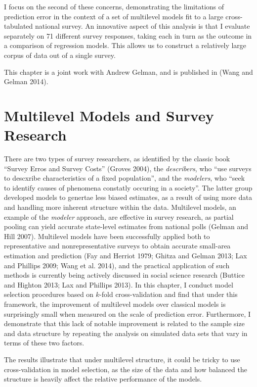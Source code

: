 I focus on the second of these concerns, demonstrating the limitations
of prediction error in the context of a set of multilevel models fit to
a large cross-tabulated national survey. An innovative aspect of this
analysis is that I evaluate separately on 71 different survey responses,
taking each in turn as the outcome in a comparison of regression models.
This allows us to construct a relatively large corpus of data out of a
single survey.

This chapter is a joint work with Andrew Gelman, and is published in
(Wang and Gelman 2014).

\section{Multilevel Models and Survey
Research}\label{multilevel-models-and-survey-research}

There are two types of survey researchers, as identified by the classic
book ``Survey Erros and Survey Costs'' (Groves 2004), the
\emph{describers}, who ``use surveys to descxribe characteristics of a
fixed population'', and the \emph{modelers}, who ``seek to identify
causes of phenomena constatly occuring in a society''. The latter group
developed models to genertae less biased estimates, as a result of using
more data and handling more inherent structure within the data.
Multilevel models, an example of the \emph{modeler} approach, are
effective in survey research, as partial pooling can yield accurate
state-level estimates from national polls (Gelman and Hill 2007).
Multilevel models have been successfully applied both to representative
and nonrepresentative surveys to obtain accurate small-area estimation
and prediction (Fay and Herriot 1979; Ghitza and Gelman 2013; Lax and
Phillips 2009; Wang et al. 2014), and the practical application of such
methods is currently being actively discussed in social science research
(Buttice and Highton 2013; Lax and Phillips 2013). In this chapter, I
conduct model selection procedures based on \(k\)-fold cross-validation
and find that under this framework, the improvement of multilevel models
over classical models is surprisingly small when measured on the scale
of prediction error. Furthermore, I demonstrate that this lack of
notable improvement is related to the sample size and data structure by
repeating the analysis on simulated data sets that vary in terms of
these two factors.

The results illustrate that under multilevel structure, it could be
tricky to use cross-validation in model selection, as the size of the
data and how balanced the structure is heavily affect the relative
performance of the models.

